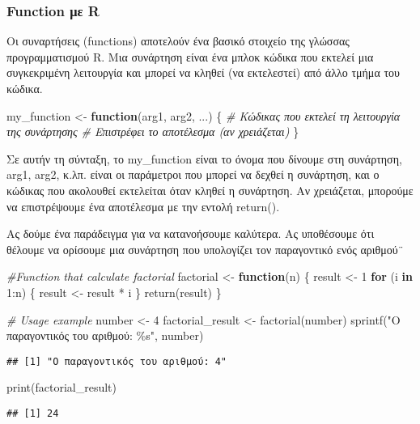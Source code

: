 \documentclass[
]{article}
\newenvironment{Shaded}{\begin{snugshade}}{\end{snugshade}}
\newcommand{\CommentTok}[1]{\textcolor[rgb]{0.56,0.35,0.01}{\textit{#1}}}
\newcommand{\ControlFlowTok}[1]{\textcolor[rgb]{0.13,0.29,0.53}{\textbf{#1}}}
\newcommand{\DecValTok}[1]{\textcolor[rgb]{0.00,0.00,0.81}{#1}}
\newcommand{\FunctionTok}[1]{\textcolor[rgb]{0.00,0.00,0.00}{#1}}
\newcommand{\NormalTok}[1]{#1}
\newcommand{\OtherTok}[1]{\textcolor[rgb]{0.56,0.35,0.01}{#1}}
\newcommand{\SpecialCharTok}[1]{\textcolor[rgb]{0.00,0.00,0.00}{#1}}
\newcommand{\StringTok}[1]{\textcolor[rgb]{0.31,0.60,0.02}{#1}}
\begin{document}
\hypertarget{function-ux3bcux3b5-r}{%
\subsubsection{Function με R}\label{function-ux3bcux3b5-r}}

Οι συναρτήσεις (functions) αποτελούν ένα βασικό στοιχείο της γλώσσας
προγραμματισμού R. Μια συνάρτηση είναι ένα μπλοκ κώδικα που εκτελεί μια
συγκεκριμένη λειτουργία και μπορεί να κληθεί (να εκτελεστεί) από άλλο
τμήμα του κώδικα.

\begin{Shaded}
\begin{Highlighting}[]
\NormalTok{my\_function }\OtherTok{\textless{}{-}} \ControlFlowTok{function}\NormalTok{(arg1, arg2, ...) \{}
  \CommentTok{\# Κώδικας που εκτελεί τη λειτουργία της συνάρτησης}
  \CommentTok{\# Επιστρέφει το αποτέλεσμα (αν χρειάζεται)}
\NormalTok{\}}
\end{Highlighting}
\end{Shaded}

Σε αυτήν τη σύνταξη, το my\_function είναι το όνομα που δίνουμε στη
συνάρτηση, arg1, arg2, κ.λπ. είναι οι παράμετροι που μπορεί να δεχθεί η
συνάρτηση, και ο κώδικας που ακολουθεί εκτελείται όταν κληθεί η
συνάρτηση. Αν χρειάζεται, μπορούμε να επιστρέψουμε ένα αποτέλεσμα με την
εντολή return().

Ας δούμε ένα παράδειγμα για να κατανοήσουμε καλύτερα. Ας υποθέσουμε ότι
θέλουμε να ορίσουμε μια συνάρτηση που υπολογίζει τον παραγοντικό ενός
αριθμού¨

\begin{Shaded}
\begin{Highlighting}[]
\CommentTok{\#Function that calculate factorial}
\NormalTok{factorial }\OtherTok{\textless{}{-}} \ControlFlowTok{function}\NormalTok{(n) \{}
\NormalTok{  result }\OtherTok{\textless{}{-}} \DecValTok{1}
  \ControlFlowTok{for}\NormalTok{ (i }\ControlFlowTok{in} \DecValTok{1}\SpecialCharTok{:}\NormalTok{n) \{}
\NormalTok{    result }\OtherTok{\textless{}{-}}\NormalTok{ result }\SpecialCharTok{*}\NormalTok{ i}
\NormalTok{  \}}
  \FunctionTok{return}\NormalTok{(result)}
\NormalTok{\}}

\CommentTok{\# Usage example}
\NormalTok{number }\OtherTok{\textless{}{-}} \DecValTok{4}
\NormalTok{factorial\_result }\OtherTok{\textless{}{-}} \FunctionTok{factorial}\NormalTok{(number)}
\FunctionTok{sprintf}\NormalTok{(}\StringTok{"Ο παραγοντικός του αριθμού: \%s"}\NormalTok{,  number)}
\end{Highlighting}
\end{Shaded}

\begin{verbatim}
## [1] "Ο παραγοντικός του αριθμού: 4"
\end{verbatim}

\begin{Shaded}
\begin{Highlighting}[]
\FunctionTok{print}\NormalTok{(factorial\_result)}
\end{Highlighting}
\end{Shaded}

\begin{verbatim}
## [1] 24
\end{verbatim}
\end{document}
